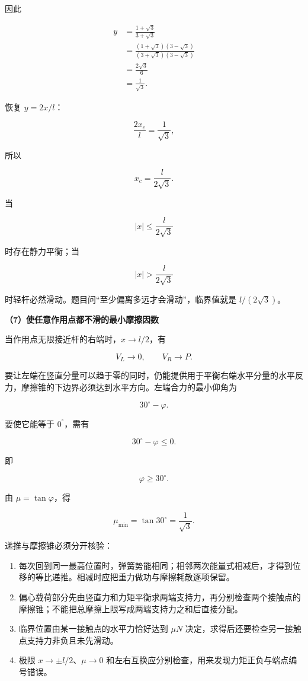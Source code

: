 \documentclass[12pt,a4paper,UTF8]{ctexart}
\newcommand{\tightlist}{\setlength{\itemsep}{0pt}\setlength{\parskip}{0pt}}
\begin{document}
因此

\[
\begin{aligned}
y
&=\frac{1+\sqrt3}{3+\sqrt3}\\
&=\frac{(1+\sqrt3)(3-\sqrt3)}{(3+\sqrt3)(3-\sqrt3)}\\
&=\frac{2\sqrt3}{6}\\
&=\frac1{\sqrt3}.
\end{aligned}
\]

恢复 \(y=2x/l\)：

\[
\frac{2x_c}{l}=\frac1{\sqrt3},
\]

所以

\[
\boxed{x_c=\frac{l}{2\sqrt3}}.
\]

当

\[|x|\le\frac{l}{2\sqrt3}\]

时存在静力平衡；当

\[
\boxed{|x|>\frac{l}{2\sqrt3}}
\]

时轻杆必然滑动。题目问``至少偏离多远才会滑动''，临界值就是
\(l/(2\sqrt3)\)。

\textbf{（7）使任意作用点都不滑的最小摩擦因数}

当作用点无限接近杆的右端时，\(x\to l/2\)，有

\[V_L\to0,
\qquad
V_R\to P.
\]

要让左端在竖直分量可以趋于零的同时，仍能提供用于平衡右端水平分量的水平反力，摩擦锥的下边界必须达到水平方向。左端合力的最小仰角为

\[30^\circ-\varphi.\]

要使它能等于 \(0^°\)，需有

\[
30^\circ-\varphi\le0.
\]

即

\[
\varphi\ge30^\circ.
\]

由 \(\mu=\tan\varphi\)，得

\[
\boxed{\mu_{\min}=\tan30^\circ=\frac1{\sqrt3}}.
\]

递推与摩擦锥必须分开核验：

\begin{enumerate}
\def\labelenumi{\arabic{enumi}.}
\tightlist
\item
  每次回到同一最高位置时，弹簧势能相同；相邻两次能量式相减后，才得到位移的等比递推。相减时应把重力做功与摩擦耗散逐项保留。
\item
  偏心载荷部分先由竖直力和力矩平衡求两端支持力，再分别检查两个接触点的摩擦锥；不能把总摩擦上限写成两端支持力之和后直接分配。
\item
  临界位置由某一接触点的水平力恰好达到 \(\mu N\)
  决定，求得后还要检查另一接触点支持力非负且未先滑动。
\item
  极限 \(x\to\pm l/2\)、\(\mu\to0\)
  和左右互换应分别检查，用来发现力矩正负与端点编号错误。
\end{enumerate}
\end{document}
